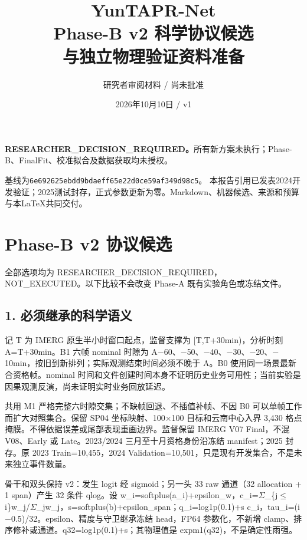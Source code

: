 \documentclass[UTF8,fontset=fandol,10pt]{ctexart}
\title{YunTAPR-Net\\Phase-B v2 科学协议候选\\与独立物理验证资料准备}
\author{研究者审阅材料 / 尚未批准}
\date{2026年10月10日 / v1}
\begin{document}
\maketitle
\textbf{RESEARCHER\_DECISION\_REQUIRED。}所有新方案未执行；Phase-B、FinalFit、校准拟合及数据获取均未授权。

基线为\texttt{6e692625ebdd\allowbreak{}9bdaeff65e22\allowbreak{}d0ce59af349d98c5}。
本报告引用已发表2024开发验证；2025测试封存，正式参数更新为零。Markdown、机器候选、来源和预算与本LaTeX共同交付。

\setcounter{tocdepth}{1}\tableofcontents
\clearpage\section{Phase-B v2 协议候选}

全部选项均为 RESEARCHER\_\allowbreak{}DECISION\_\allowbreak{}REQUIRED，NOT\_\allowbreak{}EXECUTED。以下比较不会改变 Phase-A 既有实验角色或冻结文件。

\subsection{1. 必须继承的科学语义}

记 T 为 IMERG 原生半小时窗口起点，监督支撑为 [T,T+30min)，分析时刻 A=T+30min。B1 六帧 nominal 时隙为 A\(-\)60、\(-\)50、\(-\)40、\(-\)30、\(-\)20、\(-\)10min，按旧到新排列；实际观测结束时间必须不晚于 A。B0 使用同一场景最新合资格帧。nominal 时间和文件创建时间本身不证明历史业务可用性；当前实验是因果观测反演，尚未证明实时业务回放延迟。

共用 M1 严格完整六时隙交集；不缺帧回退、不插值补帧、不因 B0 可以单帧工作而扩大对照集合。保留 SP04 坐标映射、100\(\times\)100 目标和云南中心入界 3,430 格点掩膜。不得依据误差或尾部表现重画边界。监督保留 IMERG V07 Final，不混 V08、Early 或 Late。2023/\allowbreak{}2024 三月至十月资格身份沿冻结 manifest；2025 封存。原 2023 Train=10,455，2024 Validation=10,501，只是现有开发集合，不是未来独立事件数量。

骨干和双头保持 v2：发生 logit 经 sigmoid；另一头 33 raw 通道（32 allocation + 1 span）产生 32 条件 qlog。设 w\_\allowbreak{}i=softplus(a\_\allowbreak{}i)+epsilon\_\allowbreak{}w，c\_\allowbreak{}i=\(\Sigma\)\_\allowbreak{}\{j\(\le\)i\}w\_\allowbreak{}j/\allowbreak{}\(\Sigma\)\_\allowbreak{}jw\_\allowbreak{}j，s=softplus(b)+epsilon\_\allowbreak{}span；q\_\allowbreak{}i=log1p(0.1)+s c\_\allowbreak{}i，tau\_\allowbreak{}i=(i\(-\)0.5)/\allowbreak{}32。epsilon、精度与守卫继承冻结 head，FP64 参数化，不新增 clamp、排序修补或通道。q32=log1p(0.1)+s；其物理值是 expm1(q32)，不是确定性雨强。
\end{document}
